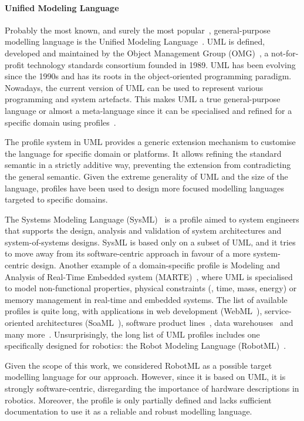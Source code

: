 \paragraph{Unified Modeling Language} Probably the most known, and surely the most popular~\cite{malavolta2012industry}, general-purpose modelling language is the Unified Modeling Language~\cite{rumbaugh2004unified}. UML is defined, developed and maintained by the Object Management Group (OMG)~\cite{omg}, a not-for-profit technology standards consortium founded in 1989. UML has been evolving since the 1990s and has its roots in the object-oriented programming paradigm. Nowadays, the current version of UML can be used to represent various programming and system artefacts. This makes UML a true general-purpose language or almost a meta-language since it can be specialised and refined for a specific domain using profiles~\cite{fuentes2004introduction}. 

The profile system in UML provides a generic extension mechanism to customise the language for specific domain or platforms. It allows refining the standard semantic in a strictly additive way, preventing the extension from contradicting the general semantic. Given the extreme generality of UML and the size of the language, profiles have been used to design more focused modelling languages targeted to specific domains.

The Systems Modeling Language (SysML)~\cite{friedenthal2014practical} is a profile aimed to system engineers that supports the design, analysis and validation of system architectures and system-of-systems designs. SysML is based only on a subset of UML, and it tries to move away from its software-centric approach in favour of a more system-centric design. Another example of a domain-specific profile is Modeling and Analysis of Real-Time Embedded system (MARTE)~\cite{faugere2007marte}, where UML is specialised to model non-functional properties, physical constraints (\eg, time, mass, energy) or memory management in real-time and embedded systems. The list of available profiles is quite long, with applications in web development (WebML~\cite{ceri2000web}), service-oriented architectures (SoaML~\cite{elvesaeter2011model}), software product lines~\cite{ziadi2003towards}, data warehouses~\cite{lujan2006uml} and many more~\cite{fontoura2000uml, aldawud2001uml}. Unsurprisingly, the long list of UML profiles includes one specifically designed for robotics: the Robot Modeling Language (RobotML)~\cite{dhouib2012robotml}.

Given the scope of this work, we considered RobotML as a possible target modelling language for our approach. However, since it is based on UML, it is strongly software-centric, disregarding the importance of hardware descriptions in robotics. Moreover, the profile is only partially defined and lacks sufficient documentation to use it as a reliable and robust modelling language.

